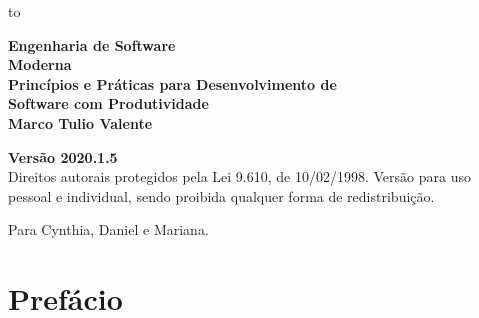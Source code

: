 \documentclass[
  11pt,
  twoside]{book}
\author{}
\date{}
\begin{document}
\frontmatter

\thispagestyle{empty}

\begin{titlepage}

\vspace*{-38mm}
  \noindent\vbox to 
\end{titlepage}

\newpage
\thispagestyle{empty}
\vspace*{4cm}
\begin{center}
{\Huge \bf  Engenharia de Software\\[.3cm] Moderna}\\ 
\vspace*{1cm}
{\Large \bf  Princípios e Práticas para Desenvolvimento de\\[.3cm] Software com Produtividade}\\ 
\vspace*{3cm}
{\Large \bf Marco Tulio Valente}
\end{center}
\newpage

\newpage
\thispagestyle{empty}
\vspace*{3cm}
\begin{center}
{\Large \bf  Versão 2020.1.5}\\ 
\vspace*{1cm}
{\large Direitos autorais protegidos pela Lei 9.610, de 10/02/1998. Versão para  uso pessoal e individual, sendo proibida qualquer forma de redistribuição.}
\end{center}

\vspace*{3cm}




\newpage
\newpage

\thispagestyle{empty}
\vspace*{5cm}
\begin{center}
\large Para Cynthia, Daniel e Mariana.
\end{center}

\newpage
\newpage

\tableofcontents

\mainmatter
\frontmatter

\hypertarget{prefuxe1cio}{%
\chapter*{Prefácio}\label{prefuxe1cio}}
\end{document}
